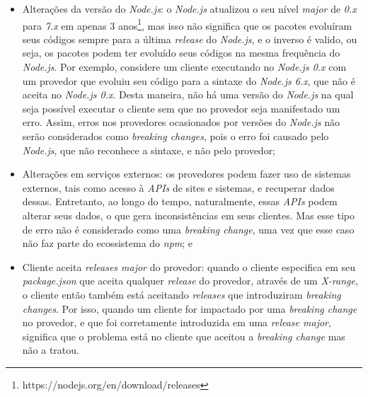 \begin{itemize}
    \item Alterações da versão do \textit{Node.js}: o \textit{Node.js} atualizou o seu nível \textit{major} de \textit{0.x} para \textit{7.x} em apenas 3 anos\footnote{https://nodejs.org/en/download/releases}, mas isso não significa que os pacotes evoluíram seus códigos sempre para a última \textit{release} do \textit{Node.js}, e o inverso é valido, ou seja, os pacotes podem ter evoluído seus códigos na mesma frequência do \textit{Node.js}. Por exemplo, considere um cliente executando no \textit{Node.js 0.x} com um provedor que evoluiu seu código para a sintaxe do \textit{Node.js 6.x}, que não é aceita no \textit{Node.js 0.x}. Desta maneira, não há uma versão do \textit{Node.js}  na qual seja possível executar o cliente sem que no provedor seja manifestado um erro. Assim, erros nos provedores ocasionados por versões do \textit{Node.js} não serão considerados como \textit{breaking changes}, pois o erro foi causado pelo \textit{Node.js}, que não reconhece a sintaxe, e não pelo provedor;

    \item Alterações em serviços externos: os provedores podem fazer uso de sistemas externos, tais como acesso à \textit{APIs} de sites e sistemas, e recuperar dados dessas. Entretanto, ao longo do tempo, naturalmente, essas \textit{APIs} podem alterar seus dados, o que gera inconsistências em seus clientes. Mas esse tipo de erro não é considerado como uma \textit{breaking change}, uma vez que esse caso não faz parte do ecossistema do \textit{npm}; e
    \item Cliente aceita \textit{releases major} do provedor: quando o cliente especifica em seu \textit{package.json} que aceita qualquer \textit{release} do provedor, através de um \textit{X-range}, o cliente então também está aceitando \textit{releases} que introduziram \textit{breaking changes}. Por isso, quando um cliente for impactado por uma \textit{breaking change} no provedor, e que foi corretamente introduzida em uma \textit{release major}, significa que o problema está no cliente que aceitou a \textit{breaking change} mas não a tratou.
\end{itemize}{}

